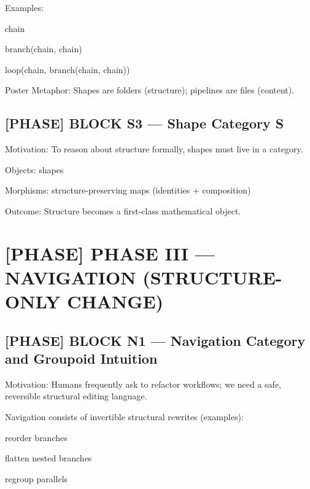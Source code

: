 Examples:\par

chain\par

branch(chain, chain)\par

loop(chain, branch(chain, chain))\par

 Poster Metaphor: Shapes are folders (structure); pipelines are files (content).\par

\subsection*{[PHASE] BLOCK S3 --- Shape Category S}

Motivation: To reason about structure formally, shapes must live in a category.\par

Objects: shapes\par

Morphisms: structure-preserving maps (identities + composition)\par

 Outcome: Structure becomes a first-class mathematical object.\par

\section*{[PHASE] PHASE III --- NAVIGATION (STRUCTURE-ONLY CHANGE)}

\subsection*{[PHASE] BLOCK N1 --- Navigation Category and Groupoid Intuition}

Motivation: Humans frequently ask to refactor workflows; we need a safe, reversible structural editing language.\par

Navigation consists of invertible structural rewrites (examples):\par

reorder branches\par

flatten nested branches\par

regroup parallels\par

